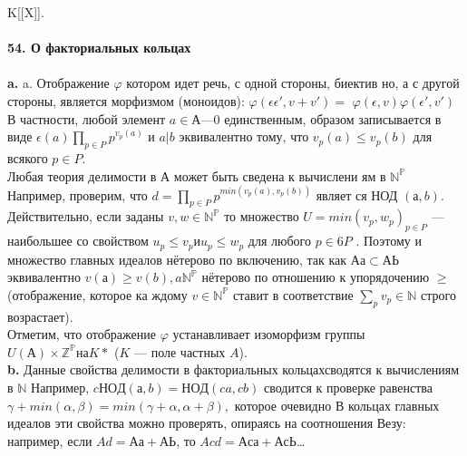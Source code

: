 \documentclass{mai_book}
\begin{document}
K[[X]].\\
\\
\noindent\textbf{54. О факториальных кольцах}\\
\\
\hspace*{15pt}\textbf{a.} a. Отображение $\varphi$ котором идет речь, с одной стороны, биектив­\linebreak
но, а с другой стороны, является морфизмом (моноидов): $\varphi(\epsilon\epsilon',v + v') =$\linebreak
$\varphi(\epsilon,v)\varphi(\epsilon', v')$ В частности, любой элемент $a \in А — {0}$ единственным,\linebreak
образом записывается в виде $\epsilon(a) \prod_{p\in P}p^{v_{p}(a)}$ и $a | b$ эквивалентно тому,\linebreak
что $v_p(a) \leqslant v_{p}(b)$ для всякого $p \in P$.\\
\hspace*{0pt}Любая теория делимости в А может быть сведена к вычислени­\linebreak
ям в $\mathbb{N^{P}}$ Например, проверим, что $d = \prod_{p \in P} p^{min(v_{p}(a),v_{p}(b))}$ являет­\linebreak
ся НОД $(а, b)$. Действительно, если заданы $v, w \in \mathbb{N^{P}}$ то множество \linebreak
$U = min(v_p, w_p)_{p \in P}$ --- наибольшее со свойством $u_p \leqslant v_p и u_p \leqslant w_p$\linebreak
для любого $p \in6 P$ . Поэтому и множество главных идеалов нётерово \linebreak
по включению, так как $Аа \subset АЬ$ эквивалентно $v(а) \geqslant v(b), a \mathbb{N^{P}}$\linebreak
нётерово по отношению к упорядочению $\geqslant$ (отображение, которое ка­\linebreak
ждому $v \in \mathbb{N^{P}}$ ставит в соответствие $\sum_{p}v_p \in \mathbb{N}$ строго возрастает).\\
\hspace*{0pt} Отметим, что отображение $\varphi$ устанавливает изоморфизм группы\linebreak
$U(А) \times \mathbb{Z^{P}} на K*$ ($K$ — поле частных $A$).\\
\hspace*{15pt}\textbf{b.} Данные свойства делимости в факториальных кольцах\linebreak сводятся
к вычислениям в $\mathbb{N}$ Например, $cНОД(а, b) = НОД (ca,cb)$ сводится к\linebreak
проверке равенства $\gamma+min(\alpha, \beta) = min(\gamma+\alpha, \alpha+\beta),$ которое очевидно\linebreak
В кольцах главных идеалов эти свойства можно проверять, опираясь на\linebreak
соотношения Везу: например, если $Ad = Аа+АЬ$, то $Acd = Аса+АсЬ$\ldots
\end{document}
